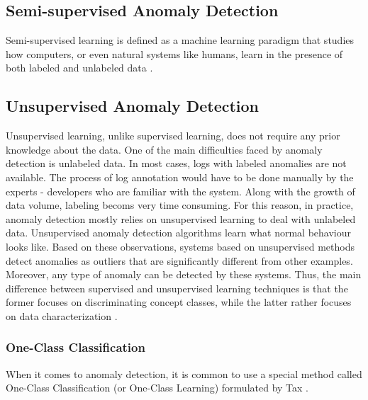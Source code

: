 \subsection{Semi-supervised Anomaly Detection} %
Semi-supervised learning is defined as a machine learning paradigm that studies how computers, or even natural systems like humans, learn in the presence of both labeled and unlabeled data \cite{zhu2009introduction}.

 
\subsection{Unsupervised Anomaly Detection}
Unsupervised learning, unlike supervised learning, does not require any prior knowledge about the data. One of the main difficulties faced by anomaly detection is unlabeled data. In most cases, logs with labeled anomalies are not available. The process of log annotation would have to be done manually by the experts - developers who are familiar with the system. Along with the growth of data volume, labeling becoms very time consuming. For this reason, in practice, anomaly detection mostly relies on unsupervised learning to deal with unlabeled data. Unsupervised anomaly detection algorithms learn what normal behaviour looks like. Based on these observations, systems based on unsupervised methods detect anomalies as outliers that are significantly different from other examples. Moreover, any type of anomaly can be detected by these systems. Thus, the main difference between supervised and unsupervised learning techniques is that the former focuses on discriminating concept classes, while the latter rather focuses on data characterization \cite{Goernitz_2013}. %
 
\subsubsection*{One-Class Classification}
When it comes to anomaly detection, it is common to use a special method called One-Class Classification (or One-Class Learning) formulated by Tax \cite{tax2002occ}. 
 
